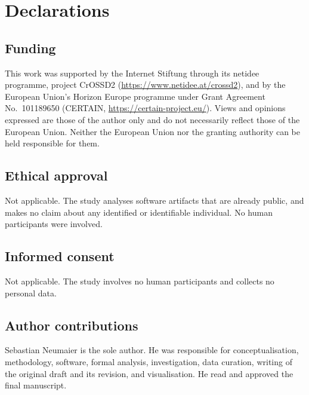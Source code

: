 \documentclass[smallextended,natbib]{svjour3}
\begin{document}










\section*{Declarations}

\subsection*{Funding}
\begin{sloppypar}
This work was supported by the Internet Stiftung through its netidee programme, project
CrOSSD2 (\url{https://www.netidee.at/crossd2}), and by the European Union's Horizon
Europe programme under Grant Agreement No.\ 101189650 (CERTAIN,
\url{https://certain-project.eu/}). Views and opinions expressed are those of the author
only and do not necessarily reflect those of the European Union. Neither the European
Union nor the granting authority can be held responsible for them.
\end{sloppypar}

\subsection*{Ethical approval}
Not applicable. The study analyses software artifacts that are already public, and makes
no claim about any identified or identifiable individual. No human participants were
involved.

\subsection*{Informed consent}
Not applicable. The study involves no human participants and collects no personal data.

\subsection*{Author contributions}
Sebastian Neumaier is the sole author. He was responsible for conceptualisation,
methodology, software, formal analysis, investigation, data curation, writing of the
original draft and its revision, and visualisation. He read and approved the final
manuscript.
\end{document}

